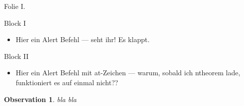 \documentclass{beamer}
\newtheorem{observation}[theorem]{Observation}
\begin{document}
  \begin{frame}[t]{Folie I.}
    \begin{block}{Block I}
    \begin{itemize}
    \item Hier ein \alert{Alert Befehl} --- seht ihr! Es klappt.
    \end{itemize}
    \end{block}
    \begin{block}{Block II}
    \begin{itemize}
        \item<alert@1>
            Hier ein Alert Befehl mit \alert{at-Zeichen}
                --- warum, sobald ich ntheorem lade, funktioniert es auf einmal nicht??
    \end{itemize}
    \end{block}
    \begin{observation}
        bla bla
    \end{observation}
  \end{frame}
\end{document}
